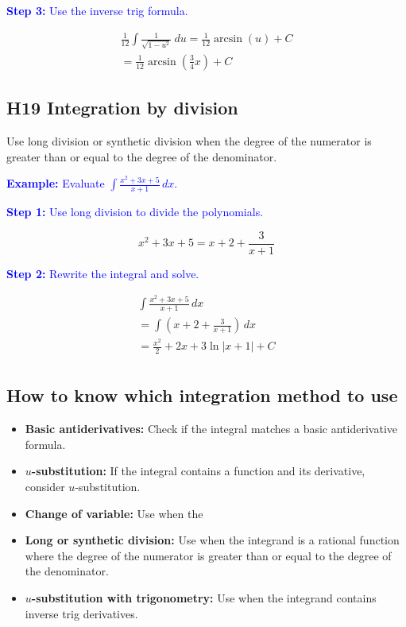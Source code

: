 \documentclass[letterpaper, 12pt]{article}
\newcommand{\example}[1]{\textcolor{blue}{\textbf{Example:} #1}}
\newcommand{\step}[2]{\textcolor{blue}{\textbf{Step #1:} #2}}
\begin{document}
\step{3}{Use the inverse trig formula.}

\begin{gather*}
\frac{1}{12} \int \frac{1}{\sqrt{1 - u^2}} \: du = \frac{1}{12} \arcsin(u) + C \\
= \boxed{\frac{1}{12} \arcsin\left(\frac{3}{4}x\right) + C}
\end{gather*}

\subsection*{H19 Integration by division}

Use long division or synthetic division when the degree of the numerator is greater than or equal to the degree of the denominator.

\example{Evaluate $\displaystyle \int \frac{x^2 + 3x + 5}{x + 1} \, dx$.}

\step{1}{Use long division to divide the polynomials.}

$$x^2 + 3x + 5 = x + 2 + \frac{3}{x + 1}$$

\step{2}{Rewrite the integral and solve.}

\begin{gather*}
\int \frac{x^2 + 3x + 5}{x + 1} \, dx \\
= \int (x + 2 + \frac{3}{x + 1}) \, dx \\
= \boxed{\frac{x^2}{2} + 2x + 3 \ln|x + 1| + C} \\
\end{gather*}

\subsection*{How to know which integration method to use}

\begin{itemize}
    \item \textbf{Basic antiderivatives:} Check if the integral matches a basic antiderivative formula.
    \item \textbf{$u$-substitution:} If the integral contains a function and its derivative, consider $u$-substitution.
    \item \textbf{Change of variable:} Use when the 
    \item \textbf{Long or synthetic division:} Use when the integrand is a rational function where the degree of the numerator is greater than or equal to the degree of the denominator.
    \item \textbf{$u$-substitution with trigonometry:} Use when the integrand contains inverse trig derivatives.
\end{itemize}
    
\end{document}
